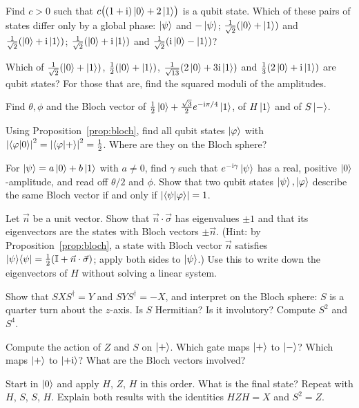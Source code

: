 \begin{exerciseset}
   Find $c>0$ such that $c\bigl((1+\mathrm{i})\left|0\right\rangle+2\left|1\right\rangle\bigr)$ is a qubit state. Which of these pairs of states differ only by a global phase: $\left|\psi\right\rangle$ and $-\left|\psi\right\rangle$; $\frac1{\sqrt2}(\left|0\right\rangle+\left|1\right\rangle)$ and $\frac1{\sqrt2}(\left|0\right\rangle+\mathrm{i}\left|1\right\rangle)$; $\frac1{\sqrt2}(\left|0\right\rangle+\mathrm{i}\left|1\right\rangle)$ and $\frac1{\sqrt2}(\mathrm{i}\left|0\right\rangle-\left|1\right\rangle)$?

   Which of $\frac1{\sqrt2}(\left|0\right\rangle+\left|1\right\rangle)$, $\frac12(\left|0\right\rangle+\left|1\right\rangle)$, $\frac{1}{\sqrt{13}}(2\left|0\right\rangle+3\mathrm{i}\left|1\right\rangle)$ and $\frac13(2\left|0\right\rangle+\mathrm{i}\left|1\right\rangle)$ are qubit states? For those that are, find the squared moduli of the amplitudes.

   Find $\theta,\phi$ and the Bloch vector of $\tfrac12\left|0\right\rangle+\tfrac{\sqrt3}{2}e^{-\mathrm{i}\pi/4}\left|1\right\rangle$, of $H\left|1\right\rangle$ and of $S\left|-\right\rangle$.

   Using Proposition~\ref{prop:bloch}, find all qubit states $\left|\varphi\right\rangle$ with $\left|\left\langle\varphi\middle|0\right\rangle\right|^2=\left|\left\langle\varphi\middle|+\right\rangle\right|^2=\tfrac12$. Where are they on the Bloch sphere?

   For $\left|\psi\right\rangle=a\left|0\right\rangle+b\left|1\right\rangle$ with $a\neq0$, find $\gamma$ such that $e^{-\mathrm{i}\gamma}\left|\psi\right\rangle$ has a real, positive $\left|0\right\rangle$-amplitude, and read off $\theta/2$ and $\phi$. Show that two qubit states $\left|\psi\right\rangle,\left|\varphi\right\rangle$ describe the same Bloch vector if and only if $\left|\left\langle\psi\middle|\varphi\right\rangle\right|=1$.

   Let $\vec n$ be a unit vector. Show that $\vec n\cdot\vec\sigma$ has eigenvalues $\pm1$ and that its eigenvectors are the states with Bloch vectors $\pm\vec n$. (Hint: by Proposition~\ref{prop:bloch}, a state with Bloch vector $\vec n$ satisfies $\left|\psi\right\rangle\!\left\langle\psi\right|=\tfrac12(\mathbb{I}+\vec n\cdot\vec\sigma)$; apply both sides to $\left|\psi\right\rangle$.) Use this to write down the eigenvectors of $H$ without solving a linear system.\label{ex:vn-sigma-eig}

   Show that $SXS^\dagger=Y$ and $SYS^\dagger=-X$, and interpret on the Bloch sphere: $S$ is a quarter turn about the $z$-axis. Is $S$ Hermitian? Is it involutory? Compute $S^2$ and $S^4$.

   Compute the action of $Z$ and $S$ on $\left|+\right\rangle$. Which gate maps $\left|+\right\rangle$ to $\left|-\right\rangle$? Which maps $\left|+\right\rangle$ to $\left|+\mathrm{i}\right\rangle$? What are the Bloch vectors involved?

   Start in $\left|0\right\rangle$ and apply $H$, $Z$, $H$ in this order. What is the final state? Repeat with $H$, $S$, $S$, $H$. Explain both results with the identities $HZH=X$ and $S^2=Z$.


\end{exerciseset}
